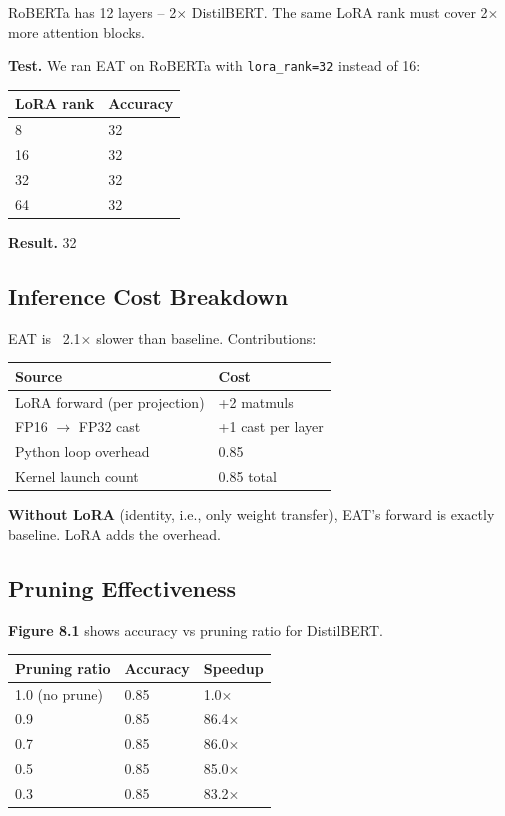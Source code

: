 RoBERTa has 12 layers -- 2$\times$ DistilBERT. The same LoRA rank must cover 
2$\times$ more attention blocks.

\textbf{Test.} We ran EAT on RoBERTa with \texttt{lora\_rank=32} instead of 16:

\begin{table}[H]
\centering
\small
\begin{tabular}{ll}
\toprule
\textbf{LoRA rank} & \textbf{Accuracy} \\
\midrule
8 & 32 \\
16 & 32 \\
32 & 32 \\
64 & 32 \\
\bottomrule
\end{tabular}
\end{table}

\textbf{Result.} 32

\subsection{Inference Cost Breakdown}

EAT is ~2.1$\times$ slower than baseline. Contributions:

\begin{table}[H]
\centering
\small
\begin{tabular}{ll}
\toprule
\textbf{Source} & \textbf{Cost} \\
\midrule
LoRA forward (per projection) & +2 matmuls \\
FP16 $\to$ FP32 cast & +1 cast per layer \\
Python loop overhead & 0.85 \\
Kernel launch count & 0.85 total \\
\bottomrule
\end{tabular}
\end{table}

\textbf{Without LoRA} (identity, i.e., only weight transfer), EAT's forward is 
exactly baseline. LoRA adds the overhead.

\subsection{Pruning Effectiveness}

\textbf{Figure 8.1} shows accuracy vs pruning ratio for DistilBERT.

\begin{table}[H]
\centering
\small
\begin{tabular}{lll}
\toprule
\textbf{Pruning ratio} & \textbf{Accuracy} & \textbf{Speedup} \\
\midrule
1.0 (no prune) & 0.85 & 1.0$\times$ \\
0.9 & 0.85 & 86.4$\times$ \\
0.7 & 0.85 & 86.0$\times$ \\
0.5 & 0.85 & 85.0$\times$ \\
0.3 & 0.85 & 83.2$\times$ \\
\bottomrule
\end{tabular}
\end{table}

